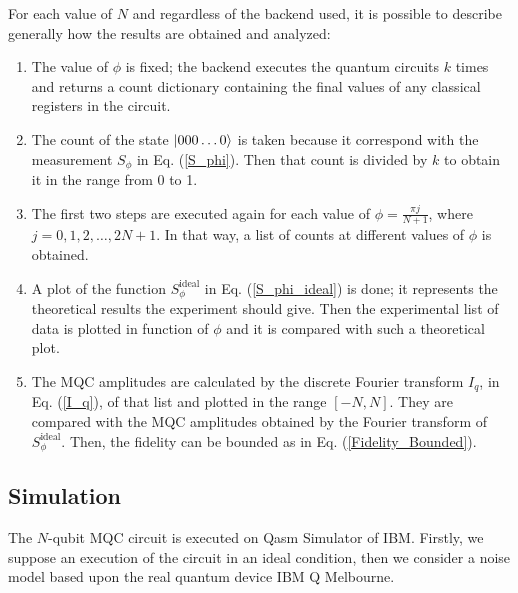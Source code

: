 \noindent For each value of $N$ and regardless of the backend used, it is possible to describe generally how the results are obtained and analyzed:
\begin{enumerate}
	\item The value of $\phi $ is fixed; the backend executes the quantum circuits $k$ times and returns a count dictionary containing the final values of any classical registers in the circuit.
	\item The count of the state  $\left| 000\dots0 \right \rangle$ is taken because it correspond with the measurement $S_{\phi}$ in Eq. (\ref{S_phi}). Then that count is divided by $k$ to obtain it in the range from 0 to 1.
	\item The first two steps are executed again for each value of $\phi = \frac{ \pi j }{N+1}$, where $j=0,1,2,\dots,2N+1$. In that way, a list of counts at different values of $\phi$ is obtained.
	\item A plot of the function $S_{\phi}^{\text{ideal}}$ in Eq. (\ref{S_phi_ideal}) is done; it represents the theoretical results the experiment should give. Then the experimental list of data is plotted in function of $\phi$ and it is compared with such a theoretical plot.
	\item The MQC amplitudes are calculated by the discrete Fourier transform $I_q$,  in Eq. (\ref{I_q}), of that list and plotted in the range $[-N,N]$. They are compared with the MQC amplitudes obtained by the Fourier transform of $S_{\phi}^{\text{ideal}}$. Then, the fidelity can be bounded as in Eq. (\ref{Fidelity_Bounded}).
\end{enumerate}


\subsection{Simulation}
The $N$-qubit MQC circuit is executed on Qasm Simulator of IBM. Firstly, we suppose an execution of the circuit in an ideal condition, then we consider a noise model based upon the real quantum device IBM Q Melbourne.

